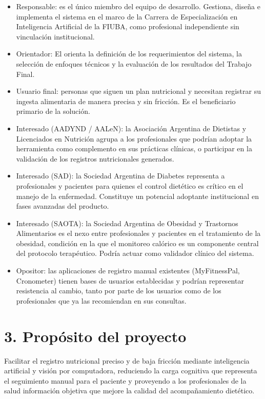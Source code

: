\documentclass[
11pt, %
]{charter}
\begin{document}
\begin{itemize}
	\item Responsable: \authorname{} es el único miembro del equipo de desarrollo. Gestiona, diseña e implementa el sistema en el marco de la Carrera de Especialización en Inteligencia Artificial de la FIUBA, como profesional independiente sin vinculación institucional.
	\item Orientador: El \supname{} orienta la definición de los requerimientos del sistema, la selección de enfoques técnicos y la evaluación de los resultados del Trabajo Final.
	\item Usuario final: personas que siguen un plan nutricional y necesitan registrar su ingesta alimentaria de manera precisa y sin fricción. Es el beneficiario primario de la solución.
	\item Interesado (AADYND / AALeN): la Asociación Argentina de Dietistas y Licenciados en Nutrición agrupa a los profesionales que podrían adoptar la herramienta como complemento en sus prácticas clínicas, o participar en la validación de los registros nutricionales generados.
	\item Interesado (SAD): la Sociedad Argentina de Diabetes representa a profesionales y pacientes para quienes el control dietético es crítico en el manejo de la enfermedad. Constituye un potencial adoptante institucional en fases avanzadas del producto.
	\item Interesado (SAOTA): la Sociedad Argentina de Obesidad y Trastornos Alimentarios es el nexo entre profesionales y pacientes en el tratamiento de la obesidad, condición en la que el monitoreo calórico es un componente central del protocolo terapéutico. Podría actuar como validador clínico del sistema.
	\item Opositor: las aplicaciones de registro manual existentes (MyFitnessPal, Cronometer) tienen bases de usuarios establecidas y podrían representar resistencia al cambio, tanto por parte de los usuarios como de los profesionales que ya las recomiendan en sus consultas.
\end{itemize}


\section{3. Propósito del proyecto}
\label{sec:proposito}

Facilitar el registro nutricional preciso y de baja fricción mediante inteligencia artificial y visión por computadora, reduciendo la carga cognitiva que representa el seguimiento manual para el paciente y proveyendo a los profesionales de la salud información objetiva que mejore la calidad del acompañamiento dietético.
\end{document}
